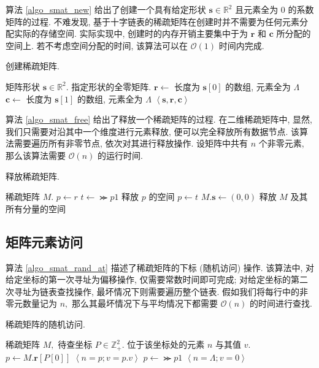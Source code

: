 算法 \ref{algo_smat_new} 给出了创建一个具有给定形状 $\bm{s} \in \mathbb{R}^2$ 且元素全为 0 的系数矩阵的过程. 不难发现, 基于十字链表的稀疏矩阵在创建时并不需要为任何元素分配实际的存储空间. 实际实现中, 创建时的内存开销主要集中于为 $\bm{r}$ 和 $\bm{c}$ 所分配的空间上. 若不考虑空间分配的时间, 该算法可以在 $\mathcal{O}(1)$ 时间内完成.
\begin{breakablealgorithm}
\caption{创建稀疏矩阵.}
\label{algo_smat_new}
\begin{algorithmic}[1]
\Require 矩阵形状 $\bm{s} \in \mathbb{R}^2.$
\Ensure 指定形状的全零矩阵.
    \State $\bm{r} \gets$ 长度为 $\bm{s}[0]$ 的数组, 元素全为 $\Lambda$
    \State $\bm{c} \gets$ 长度为 $\bm{s}[1]$ 的数组, 元素全为 $\Lambda$
    \State \Return $\left\langle \bm{s}, \bm{r}, \bm{c} \right\rangle$
\EndFunction
\end{algorithmic}
\end{breakablealgorithm}

算法 \ref{algo_smat_free} 给出了释放一个稀疏矩阵的过程. 在二维稀疏矩阵中, 显然, 我们只需要对沿其中一个维度进行元素释放, 便可以完全释放所有数据节点. 该算法需要遍历所有非零节点, 依次对其进行释放操作. 设矩阵中共有 $n$ 个非零元素, 那么该算法需要 $\mathcal{O}(n)$ 的运行时间.
\begin{breakablealgorithm}
\caption{释放稀疏矩阵.}
\label{algo_smat_free}
\begin{algorithmic}[1]
\Require 稀疏矩阵 $M$.
        \State $p \gets r$
            \State $t \gets \Succ{p}{1}$
            \State 释放 $p$ 的空间
            \State $p \gets t$
        \EndWhile
    \EndFor
    \State $M.\bm{s} \gets (0, 0)$
    \State 释放 $M$ 及其所有分量的空间
\EndProcedure
\end{algorithmic}
\end{breakablealgorithm}

\subsection{矩阵元素访问}

算法 \ref{algo_smat_rand_at} 描述了稀疏矩阵的下标 (随机访问) 操作. 该算法中, 对给定坐标的第一次寻址为偏移操作, 仅需要常数时间即可完成; 对给定坐标的第二次寻址为链表查找操作, 最坏情况下则需要遍历整个链表. 假如我们将每行中的非零元数量记为 $n,$ 那么其最坏情况下与平均情况下都需要 $\mathcal{O}(n)$ 的时间进行查找.
\begin{breakablealgorithm}
\caption{稀疏矩阵的随机访问.}
\label{algo_smat_rand_at}
\begin{algorithmic}[1]
\Require 稀疏矩阵 $M,$ 待查坐标 $P \in \mathbb{Z}_{+}^{2}.$
\Ensure 位于该坐标处的元素 $n$ 与其值 $v.$
    \State $p \gets M.\bm{r}[P[0]]$
            \State \Return $\left\langle n=p; v=p.v \right\rangle$
        \EndIf
        \State $p \gets \Succ{p}{1}$
    \EndWhile
    \State \Return $\left\langle n=\Lambda; v=0 \right\rangle$
\EndFunction
\end{algorithmic}
\end{breakablealgorithm}

